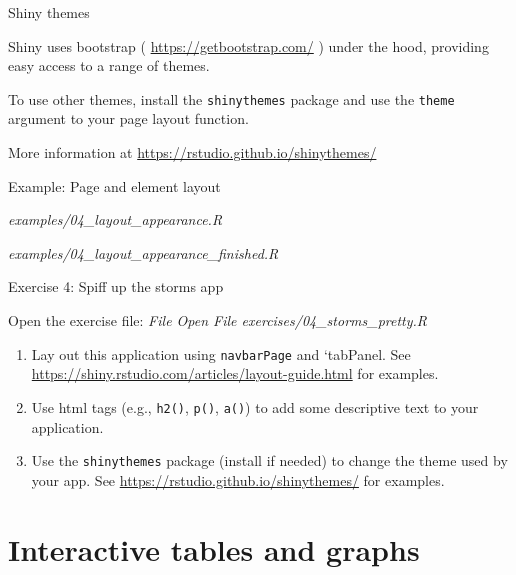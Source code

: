 \documentclass[
  12pt,
  ignorenonframetext,
]{beamer}
\providecommand{\tightlist}{%
  \setlength{\itemsep}{0pt}\setlength{\parskip}{0pt}}
\begin{document}
\begin{frame}[fragile]{Shiny themes}
\protect\hypertarget{shiny-themes}{}

Shiny uses bootstrap ( \url{https://getbootstrap.com/} ) under the hood,
providing easy access to a range of themes.

To use other themes, install the \texttt{shinythemes} package and use
the \texttt{theme} argument to your page layout function.

More information at \url{https://rstudio.github.io/shinythemes/}

\end{frame}

\begin{frame}{Example: Page and element layout}
\protect\hypertarget{example-page-and-element-layout}{}

\begin{description}
\tightlist
\item[Start]
\emph{examples/04\_layout\_appearance.R}
\item[Finished]
\emph{examples/04\_layout\_appearance\_finished.R}
\end{description}

\end{frame}

\begin{frame}[fragile]{Exercise 4: Spiff up the storms app}
\protect\hypertarget{exercise-4-spiff-up-the-storms-app}{}

Open the exercise file: \emph{File \rightarrow Open File
\rightarrow exercises/04\_storms\_pretty.R}

\begin{enumerate}
\item
  Lay out this application using \texttt{navbarPage} and `tabPanel. See
  \url{https://shiny.rstudio.com/articles/layout-guide.html} for
  examples.
\item
  Use html tags (e.g., \texttt{h2()}, \texttt{p()}, \texttt{a()}) to add
  some descriptive text to your application.
\item
  Use the \texttt{shinythemes} package (install if needed) to change the
  theme used by your app. See
  \url{https://rstudio.github.io/shinythemes/} for examples.
\end{enumerate}

\end{frame}

\hypertarget{interactive-tables-and-graphs}{%
\section{Interactive tables and
graphs}\label{interactive-tables-and-graphs}}
\end{document}
